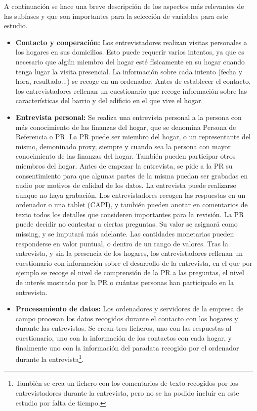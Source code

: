 A continuación se hace una breve descripción de los aspectos más relevantes de las subfases y que son importantes para la selección de variables para este estudio.

\begin{itemize}
    \item \textbf{Contacto y cooperación:} Los entrevistadores realizan visitas personales a los hogares en sus domicilios. Esto puede requerir varios intentos, ya que es necesario que algún miembro del hogar esté físicamente en su hogar cuando tenga lugar la visita presencial. La información sobre cada intento (fecha y hora, resultado...) se recoge en un ordenador. Antes de establecer el contacto, los entrevistadores rellenan un cuestionario que recoge información sobre las características del barrio y del edificio en el que vive el hogar.
    \item \textbf{Entrevista personal:} Se realiza una entrevista personal a la persona con más conocimiento de las finanzas del hogar, que se denomina Persona de Referencia o PR. La PR puede ser miembro del hogar, o un representante del mismo, demoninado proxy, siempre y cuando sea la persona con mayor conocimiento de las finanzas del hogar. También pueden participar otros miembros del hogar. Antes de empezar la entrevista, se pide a la PR su consentimiento para que algunas partes de la misma puedan ser grabadas en audio por motivos de calidad de los datos. La entrevista puede realizarse aunque no haya grabación. Los entrevistadores recogen las respuestas en un ordenador o una tablet (CAPI), y también pueden anotar en comentarios de texto todos los detalles que consideren importantes para la revisión. La PR puede decidir no contestar a ciertas preguntas. Su valor se asignará como missing, y se imputará más adelante. Las cantidades monetarias pueden responderse en valor puntual, o dentro de un rango de valores. Tras la entrevista, y sin la presencia de los hogares, los entrevistadores rellenan un cuestionario con información sobre el desarrollo de la entrevista, en el que por ejemplo se recoge el nivel de comprensión de la PR a las preguntas, el nivel de interés mostrado por la PR o cuántas personas han participado en la entrevista.
    \item \textbf{Procesamiento de datos:} Los ordenadores y servidores de la empresa de campo procesan los datos recogidos durante el contacto con los hogares y durante las entrevistas. Se crean tres ficheros, uno con las respuestas al cuestionario, uno con la información de los contactos con cada hogar, y finalmente uno con la información del paradata recogido por el ordenador durante la entrevista\footnote{También se crea un fichero con los comentarios de texto recogidos por los entrevistadores durante la entrevista, pero no se ha podido incluir en este estudio por falta de tiempo.}.

\end{itemize}
